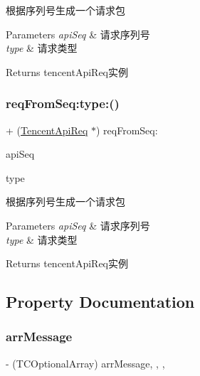根据序列号生成一个请求包 
\begin{DoxyParams}{Parameters}
{\em api\+Seq} & 请求序列号 \\
\hline
{\em type} & 请求类型 \\
\hline
\end{DoxyParams}
\begin{DoxyReturn}{Returns}
tencent\+Api\+Req实例 
\end{DoxyReturn}
\mbox{\label{interface_tencent_api_req_ae0301f606ff6da9edd28298b1f59df10}} 
\subsubsection{\texorpdfstring{req\+From\+Seq\+:type\+:()}{reqFromSeq:type:()}\hspace{0.1cm}{\footnotesize\ttfamily [2/2]}}
{\footnotesize\ttfamily + (\mbox{\hyperlink{interface_tencent_api_req}{Tencent\+Api\+Req}} $\ast$) req\+From\+Seq\+: \begin{DoxyParamCaption}\item[{(N\+S\+Integer)}]{api\+Seq }\item[{type:(Tencent\+Req\+Message\+Type)}]{type }\end{DoxyParamCaption}}

根据序列号生成一个请求包 
\begin{DoxyParams}{Parameters}
{\em api\+Seq} & 请求序列号 \\
\hline
{\em type} & 请求类型 \\
\hline
\end{DoxyParams}
\begin{DoxyReturn}{Returns}
tencent\+Api\+Req实例 
\end{DoxyReturn}


\subsection{Property Documentation}
\mbox{\label{interface_tencent_api_req_a6585a0dabcd262c39da97b75af1556dc}} 
\subsubsection{\texorpdfstring{arr\+Message}{arrMessage}}
{\footnotesize\ttfamily -\/ (T\+C\+Optional\+Array) arr\+Message\hspace{0.3cm}{\ttfamily [read]}, {\ttfamily [write]}, {\ttfamily [nonatomic]}, {\ttfamily [retain]}}

